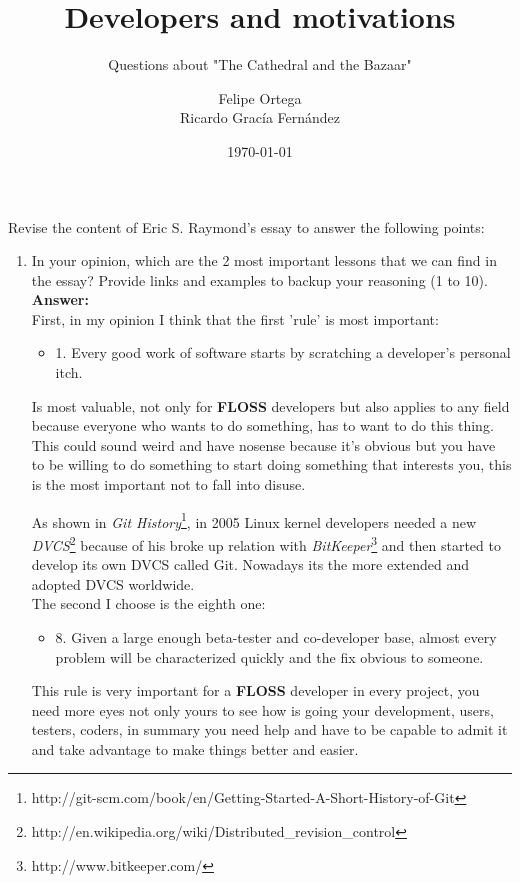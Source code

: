 \documentclass[11pt]{scrartcl}
\title{\textbf{Developers and motivations}}
\subtitle{Questions about "The Cathedral and the Bazaar"}
\author{Felipe Ortega\\
		Ricardo Grac\'ia Fern\'andez}
\date{\today}
\begin{document}
\maketitle

Revise the content of Eric S. Raymond's essay to answer the following points:
	\begin{enumerate}
		\item In your opinion, which are the 2 most important lessons that we can find in the essay? Provide links and examples to backup your reasoning (1 to 10).\\
		
			\textbf{Answer:}\\
			
			First, in my opinion I think that the first 'rule' is most important:
			\begin{itemize}
				\item 1. Every good work of software starts by scratching a developer's personal itch.
			\end{itemize}
			
			\indent Is most valuable, not only for \textbf{FLOSS} developers but also applies to any field because everyone who wants to do something, has to want to do this thing. This could sound weird and have nosense because it's obvious but you have to be willing to do something to start doing something that interests you, this is the most important not to fall into disuse.
			
			\indent As shown in \emph{Git History}\footnote{http://git-scm.com/book/en/Getting-Started-A-Short-History-of-Git}, in 2005 Linux kernel developers needed a new \emph{DVCS}\footnote{http://en.wikipedia.org/wiki/Distributed\_revision\_control} because of his broke up relation with \emph{BitKeeper}\footnote{http://www.bitkeeper.com/} and then started to develop its own DVCS called Git. Nowadays its the more extended and adopted DVCS worldwide.\\
			
			The second I choose is the eighth one:
			\begin{itemize}
				\item 8. Given a large enough beta-tester and co-developer base, almost every problem will be characterized quickly and the fix obvious to someone.
			\end{itemize}
			
			\indent This rule is very important for a \textbf{FLOSS} developer in every project, you need more eyes not only yours to see how is going your development, users, testers, coders, in summary you need help and have to be capable to admit it and take advantage to make things better and easier.
			

\end{enumerate}
\end{document}
